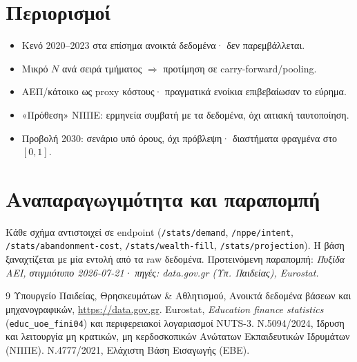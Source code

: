 \documentclass[11pt]{article}
\begin{document}
\section{Περιορισμοί}
\begin{itemize}[leftmargin=1.4em,itemsep=1pt]
\item Κενό 2020--2023 στα επίσημα ανοικτά δεδομένα· δεν παρεμβάλλεται.
\item Μικρό $N$ ανά σειρά τμήματος $\Rightarrow$ προτίμηση σε carry-forward/pooling.
\item ΑΕΠ/κάτοικο ως proxy κόστους· πραγματικά ενοίκια επιβεβαίωσαν το εύρημα.
\item «Πρόθεση» ΝΠΠΕ: ερμηνεία συμβατή με τα δεδομένα, όχι αιτιακή ταυτοποίηση.
\item Προβολή 2030: σενάριο υπό όρους, όχι πρόβλεψη· διαστήματα φραγμένα στο $[0,1]$.
\end{itemize}

\section{Αναπαραγωγιμότητα και παραπομπή}

Κάθε σχήμα αντιστοιχεί σε endpoint (\texttt{/stats/demand}, \texttt{/nppe/intent},
\texttt{/stats/abandonment-cost}, \texttt{/stats/wealth-fill},
\texttt{/stats/projection}). Η βάση ξαναχτίζεται με μία εντολή από τα raw
δεδομένα. Προτεινόμενη παραπομπή: \emph{Πυξίδα ΑΕΙ, στιγμιότυπο 2026-07-21· πηγές:
data.gov.gr (Υπ. Παιδείας), Eurostat.}

\begin{thebibliography}{9}
 Υπουργείο Παιδείας, Θρησκευμάτων \& Αθλητισμού, Ανοικτά
δεδομένα βάσεων και μηχανογραφικών, \url{https://data.gov.gr}.
 Eurostat, \emph{Education finance statistics}
(\texttt{educ\_uoe\_fini04}) και περιφερειακοί λογαριασμοί NUTS-3.
 Ν.5094/2024, Ίδρυση και λειτουργία μη κρατικών, μη κερδοσκοπικών
Ανώτατων Εκπαιδευτικών Ιδρυμάτων (ΝΠΠΕ).
 Ν.4777/2021, Ελάχιστη Βάση Εισαγωγής (ΕΒΕ).
\end{thebibliography}
\end{document}
